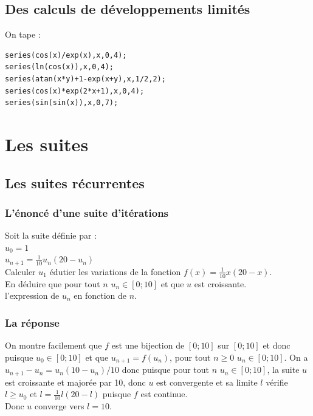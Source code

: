 \documentclass[a4paper,11pt]{book}
\begin{document}
\section{Des calculs de d\'eveloppements limit\'es}
On tape :
\begin{verbatim}
series(cos(x)/exp(x),x,0,4);
series(ln(cos(x)),x,0,4);
series(atan(x*y)+1-exp(x+y),x,1/2,2);
series(cos(x)*exp(2*x+1),x,0,4);
series(sin(sin(x)),x,0,7);
\end{verbatim}


\chapter{Les suites}
\section{Les suites r\'ecurrentes}
\subsection{L'\'enonc\'e d'une suite d'it\'erations}
Soit la suite d\'efinie par :\\
$u_0=1$\\
$u_{n+1}=\frac{1}{10}u_n(20-u_n)$\\
Calculer $u_1$ \'edutier les variations de la fonction $f(x)=\frac{1}{10}x(20-x)$.\\
En d\'eduire que pour tout $n$ $u_n \in [0;10]$ et que $u$ est croissante.\\
l'expression de $u_n$ en fonction de $n$.
\subsection{La r\'eponse}
On montre facilement que $f$ est une bijection de $[0;10]$ sur $[0;10]$ et donc
puisque $u_0 \in [0;10]$ et que $u_{n+1}=f(u_n)$, 
pour tout $n\geq 0$ $u_n \in [0;10]$.
On a $u_{n+1}-u_n=u_n(10-u_n)/10$ donc puisque pour tout $n$ $u_n \in [0;10]$,
la suite $u$ est croissante et major\'ee par 10, donc $u$ est convergente et 
sa limite $l$ v\'erifie  $l\geq u_0$ et $l=\frac{1}{10}l(20-l)$ 
puisque $f$ est continue.\\
Donc $u$ converge vers $l=10$.  
\end{document}
